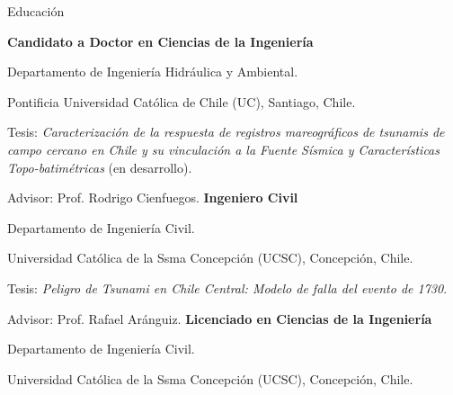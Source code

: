 \begin{rubric}{Educación}

\entry*[Since  2015]%
	\textbf{Candidato a Doctor en Ciencias de la Ingeniería}
	\par Departamento de Ingeniería Hidráulica y Ambiental.
	 \par Pontificia Universidad Cat\'olica de Chile (UC), Santiago, Chile.
	 \par Tesis: \emph{Caracterización de la respuesta de registros mareográficos de tsunamis de campo cercano en Chile y su vinculación a la Fuente Sísmica y Características Topo-batimétricas} (en desarrollo).
	 \par Advisor: Prof. Rodrigo Cienfuegos.
%
\entry*[2008 -- 2015]%
	\textbf{Ingeniero Civil}
	\par Departamento de Ingeniería Civil.
	 \par Universidad Cat\'olica de la Ssma Concepci\'on (UCSC), Concepci\'on, Chile.
	 \par Tesis: \emph{Peligro de Tsunami en Chile Central: Modelo de falla del evento de 1730}.
	 \par Advisor: Prof. Rafael Ar\'anguiz.
%
\entry*[2008 -- 2012]%
	\textbf{Licenciado en Ciencias de la Ingeniería}
	\par Departamento de Ingeniería Civil.
	\par Universidad Cat\'olica de la Ssma Concepci\'on (UCSC), Concepci\'on, Chile. %
\end{rubric}
